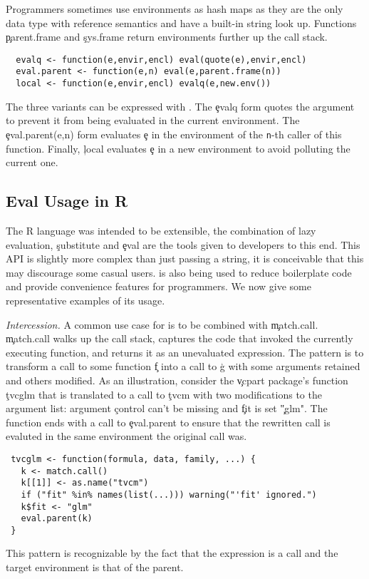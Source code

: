 \documentclass[screen,acmsmall]{acmart}
\newcommand{\mypara}[1]{\medskip\noindent\emph{#1}\xspace}
\begin{document}
\noindent Programmers sometimes use environments as hash maps as they are the
only data type with reference semantics and have a built-in string look up.
Functions \c{parent.frame} and \c{sys.frame} return environments further up the
call stack.
 \begin{lstlisting}
  evalq <- function(e,envir,encl) eval(quote(e),envir,encl)
  eval.parent <- function(e,n) eval(e,parent.frame(n))
  local <- function(e,envir,encl) evalq(e,new.env())
\end{lstlisting}
The three \eval variants can be expressed with \eval. The \c{evalq} form quotes
the argument to prevent it from being evaluated in the current environment. The
\c{eval.parent(e,n)} form evaluates \c{e} in the environment of the {\tt n}-th
caller of this function. Finally, \c{local} evaluates \c{e} in a new environment
to avoid polluting the current one.

\subsection{Eval Usage in R}

The R language was intended to be extensible, the combination of lazy
evaluation, \c{substitute} and \c{eval} are the tools given to
developers to this end. This API is slightly more complex than just
passing a string, it is conceivable that this may discourage some
casual users. \Eval is also being used to reduce boilerplate code and
provide convenience features for programmers. We now give some
representative examples of its usage.

\mypara{Intercession.} A common use case for \eval is to be combined with
\c{match.call}. \c{match.call} walks up the call stack, captures the code that
invoked the currently executing function, and returns it as an unevaluated
expression. The pattern is to transform a call to some function \c{f} into a
call to \c{g} with some arguments retained and others modified. As an
illustration, consider the \c{vcpart} package's function \c{tvcglm} that is
translated to a call to \c{tvcm} with two modifications to the argument list:
argument \c{control} can't be missing and \c{fit} is set \c{"glm"}. The function
ends with a call to \c{eval.parent} to ensure that the rewritten call is
evaluted in the same environment the original call was.
\begin{lstlisting}
 tvcglm <- function(formula, data, family, ...) {
   k <- match.call()
   k[[1]] <- as.name("tvcm")
   if ("fit" %in% names(list(...))) warning("'fit' ignored.")
   k$fit <- "glm"
   eval.parent(k)
 }
\end{lstlisting}
This pattern is recognizable by the fact that the expression is a call
and the target environment is that of the parent.
\end{document}
